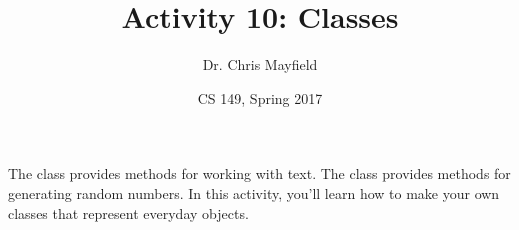 \documentclass[12pt]{article}
\title{Activity 10: Classes}
\author{Dr. Chris Mayfield}
\date{CS 149, Spring 2017}
\begin{document}
\maketitle

The  class provides methods for working with text. The  class provides methods for generating random numbers. In this activity, you'll learn how to make your own classes that represent everyday objects.






\newpage

%
\end{document}
